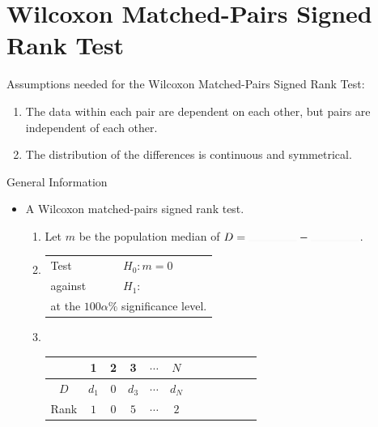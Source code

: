 \documentclass[../Notes.tex]{subfiles}
\begin{document}
\section{Wilcoxon Matched-Pairs Signed Rank Test}
\begin{note}
  Assumptions needed for the Wilcoxon Matched-Pairs Signed Rank Test:
  \begin{enumerate}
    \item The data within each pair are dependent on each other, but pairs are independent of each other.
    \item The distribution of the differences is continuous and symmetrical.
  \end{enumerate}
\end{note}
\begin{stbox}{General Information}
  \begin{itemize}
    \item A Wilcoxon matched-pairs signed rank test. 
    \begin{enumerate}
      \item Let \(m\) be the population median of \(D=\rule{1.5cm}{0.01mm}-\rule{1.5cm}{0.01mm}\).
      \item 
      \begin{tabular}{|ll|}
        \hline
        Test & \(H_0\colon m=0\)\\
        against &\(H_1\colon\) 
        \begin{enumerate*}[itemjoin={\quad}]
          \item \(m<\highlight[yellow]{0}\),
          \item \(m\neq \highlight[yellow]{0}\),\quad or
          \item \(m>\highlight[yellow]{0}\),
        \end{enumerate*}\\
        \multicolumn{2}{|l|}{at the \(100\alpha\%\) significance level.}\\
        \hline
      \end{tabular}
      \item ~
      \begin{table}[H]
        \centering
        \begin{tabular}{|Sc|Sc|Sc|Sc|Sc|Sc|}
           & 1 & 2 & 3 & \(\cdots\) & \(N\)\\
          \hline 
          \(D\) & \(d_1\) & \(0\) & \(d_3\) & \(\cdots\) & \(d_N\)\\
          \hline
          Rank & \(1\) & \(0\) & \(5\) & \(\cdots\) & \(2\)\\

\end{tabular}
\end{table}
\end{enumerate}
\end{itemize}
\end{stbox}
\end{document}
